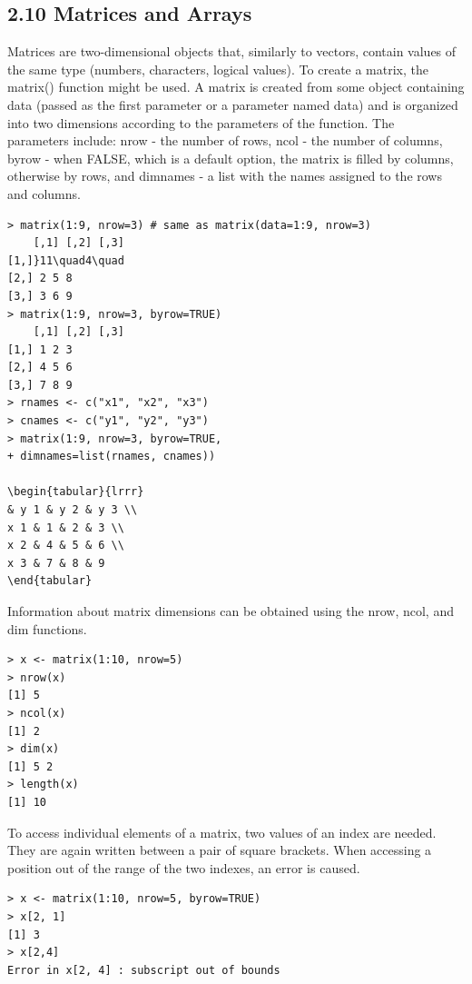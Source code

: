\documentclass[10pt]{book}
\begin{document}
\subsection*{2.10 Matrices and Arrays}
Matrices are two-dimensional objects that, similarly to vectors, contain values of the same type (numbers, characters, logical values). To create a matrix, the matrix() function might be used. A matrix is created from some object containing data (passed as the first parameter or a parameter named data) and is organized into two dimensions according to the parameters of the function. The\\
parameters include: nrow - the number of rows, ncol - the number of columns, byrow - when FALSE, which is a default option, the matrix is filled by columns, otherwise by rows, and dimnames - a list with the names assigned to the rows and columns.

\begin{verbatim}
> matrix(1:9, nrow=3) # same as matrix(data=1:9, nrow=3)
    [,1] [,2] [,3]
[1,]}11\quad4\quad
[2,] 2 5 8
[3,] 3 6 9
> matrix(1:9, nrow=3, byrow=TRUE)
    [,1] [,2] [,3]
[1,] 1 2 3
[2,] 4 5 6
[3,] 7 8 9
> rnames <- c("x1", "x2", "x3")
> cnames <- c("y1", "y2", "y3")
> matrix(1:9, nrow=3, byrow=TRUE,
+ dimnames=list(rnames, cnames))

\begin{tabular}{lrrr} 
& y 1 & y 2 & y 3 \\
x 1 & 1 & 2 & 3 \\
x 2 & 4 & 5 & 6 \\
x 3 & 7 & 8 & 9
\end{tabular}
\end{verbatim}

Information about matrix dimensions can be obtained using the nrow, ncol, and dim functions.

\begin{verbatim}
> x <- matrix(1:10, nrow=5)
> nrow(x)
[1] 5
> ncol(x)
[1] 2
> dim(x)
[1] 5 2
> length(x)
[1] 10
\end{verbatim}

To access individual elements of a matrix, two values of an index are needed. They are again written between a pair of square brackets. When accessing a position out of the range of the two indexes, an error is caused.

\begin{verbatim}
> x <- matrix(1:10, nrow=5, byrow=TRUE)
> x[2, 1]
[1] 3
> x[2,4]
Error in x[2, 4] : subscript out of bounds
\end{verbatim}
\end{document}
